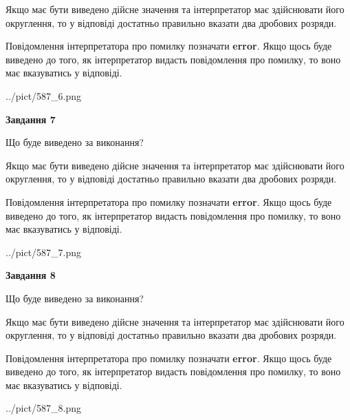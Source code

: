 \documentclass[12pt, ukrainian]{article}
\begin{document}
{\begin {Large}
Якщо має бути виведено дійсне значення та інтерпретатор має здійснювати його округлення, 
то у відповіді достатньо правильно вказати два дробових розряди.

Повідомлення інтерпретатора про помилку позначати \textbf{error}.
Якщо щось буде виведено до того, як інтерпретатор видасть повідомлення про помилку, 
то воно має вказуватись у відповіді. \par

\begin{center}
	{../pict/587_6.png}
\end{center}
\newpage

{\begin {center}\textbf{Завдання 7}\end {center}}\par
Що буде виведено за виконання? \par

Якщо має бути виведено дійсне значення та інтерпретатор має здійснювати його округлення, 
то у відповіді достатньо правильно вказати два дробових розряди.

Повідомлення інтерпретатора про помилку позначати \textbf{error}.
Якщо щось буде виведено до того, як інтерпретатор видасть повідомлення про помилку, 
то воно має вказуватись у відповіді. \par

\begin{center}
	{../pict/587_7.png}
\end{center}
\newpage

{\begin {center}\textbf{Завдання 8}\end {center}}\par
Що буде виведено за виконання? \par

Якщо має бути виведено дійсне значення та інтерпретатор має здійснювати його округлення, 
то у відповіді достатньо правильно вказати два дробових розряди.

Повідомлення інтерпретатора про помилку позначати \textbf{error}.
Якщо щось буде виведено до того, як інтерпретатор видасть повідомлення про помилку, 
то воно має вказуватись у відповіді. \par

\begin{center}
	{../pict/587_8.png}
\end{center}
\newpage


\end{Large}}
\end{document}

